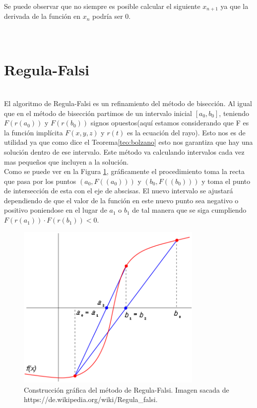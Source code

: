 Se puede observar que no siempre es posible calcular el siguiente $x_{n+1}$ ya que la derivada de la función en $x_{n}$ podría ser $0$.
${ }$\\
${ }$\\

${ }$\\
\section{Regula-Falsi}
${ }$\\

El algoritmo de Regula-Falsi es un refinamiento del método de bisección. Al igual que en el método de bisección partimos de un intervalo inicial $[a_0, b_0]$, teniendo $F(r(a_0))$ y $F(r(b_0))$ signos opuestos(aquí estamos considerando que F es la función implícita $F(x,y,z)$ y $r(t)$ es la ecuación del rayo). Esto nos es de utilidad ya que como dice el Teorema\ref{teo:bolzano} esto nos garantiza que hay una solución dentro de ese intervalo. Este método va calculando intervalos cada vez mas pequeños que incluyen a la solución.
${ }$\\

Como se puede ver en la Figura \ref{fig:etiq_8}, gráficamente el procedimiento toma la recta que pasa por los puntos $(a_0, F((a_0)))$ y $(b_0, F((b_0)))$ y toma el punto de intersección de esta con el eje de abscisas. El nuevo intervalo se ajustará dependiendo de que el valor de la función en este nuevo punto sea negativo o positivo poniendose en el lugar de $a_1$ o $b_1$ de tal manera que se siga cumpliendo $F(r(a_1)) \cdot F(r(b_1)) < 0$.
${ }$\\

\begin{figure}[h]
	\begin{center}
		\includegraphics[width=0.8\textwidth]{imagenes/regulaF.png}
	\end{center}
	\caption{Construcción gráfica del método de Regula-Falsi. Imagen sacada de https://de.wikipedia.org/wiki/Regula\_falsi.}
	\label{fig:etiq_8}
\end{figure}
${ }$\\

